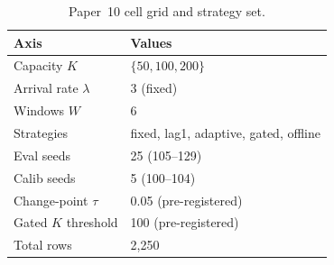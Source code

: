 \begin{table}[!t]
  \caption{Paper~10 cell grid and strategy set.}
  \label{tab:grid}
  \centering
  \small
  \setlength{\tabcolsep}{4pt}
  \begin{tabular}{@{}p{2.8cm}p{4.7cm}@{}}
    \toprule
    \textbf{Axis} & \textbf{Values} \\
    \midrule
    Capacity $K$ & $\{50, 100, 200\}$ \\
    Arrival rate $\lambda$ & 3 (fixed) \\
    Windows $W$ & 6 \\
    Strategies & fixed, lag1, adaptive, gated, offline \\
    Eval seeds & 25 (105--129) \\
    Calib seeds & 5 (100--104) \\
    Change-point $\tau$ & 0.05 (pre-registered) \\
    Gated $K$ threshold & 100 (pre-registered) \\
    \midrule
    Total rows & 2{,}250 \\
    \bottomrule
  \end{tabular}
\end{table}

